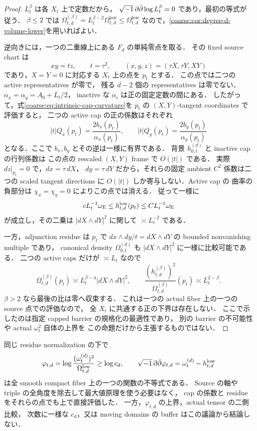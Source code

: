 \documentclass[a4paper,11pt]{ltjsarticle}
\numberwithin{equation}{section}
\theoremstyle{plain}
\theoremstyle{definition}
\theoremstyle{remark}
\begin{document}
\begin{proof}
$L_t^\beta$ は各 $X_t$ 上で定数だから，
$\sqrt{-1}\,\partial\bar\partial\log L_t^\beta=0$ であり，最初の等式が従う．
$\beta\le2$ では
$\Omega_{t,d}^{(\beta)}=L_t^{\beta-2}\Omega_{t,d}^{\mathrm{low}}
\le\Omega_{t,d}^{\mathrm{low}}$
なので，\cref{coarse:cor:degree-d-volume-lower}を用いればよい．

逆向きには，一つの二重線上にある $F_d$ の単純零点を取る．
その fixed source chart は
\[
 xy=tz,\qquad t=\tau^2,\qquad
 (x,y,z)=(\tau X,\tau Y,XY)
\]
であり，$X=Y=0$ に対応する $X_t$ 上の点を $p_t$ とする．
この点では二つの active representatives が零で，
残る $d-2$ 個の representatives は零でない．
$\alpha_x=\alpha_y=A_0+L_t/2$，
inactive な $\alpha_i$ は正の固定定数の間にある．
したがって，式\eqref{coarse:eq:intrinsic-cap-curvature}を
$p_t$ の $(X,Y)$-tangent coordinates で評価すると，
二つの active cap の正の係数はそれぞれ
\[
 |t|Q_x(p_t)=\frac{2b_x(p_t)}{\alpha_x(p_t)},
 \qquad
 |t|Q_y(p_t)=\frac{2b_y(p_t)}{\alpha_y(p_t)}
\]
となる．ここで $b_x,b_y$ とその逆は一様に有界である．
背景 $h_{0,t}^{(d)}$ と inactive cap の行列係数は
この点の rescaled $(X,Y)$ frame で $O(|t|)$ である．
実際 $dz|_{p_t}=0$ で，$dx=\tau\,dX$，
$dy=\tau\,dY$ だから，それらの固定 ambient
$C^2$ 係数は二つの scaled tangent directions に
$O(|t|)$ しか寄与しない．Active cap の
曲率の負部分は $\chi_x=\chi_y=0$ によりこの点では消える．
従って一様に
\[
 cL_t^{-1}\omega_{\rm E}\le h_{t,d}^{\mathrm{low}}(p_t)
 \le CL_t^{-1}\omega_{\rm E}
\]
が成立し，その二乗は
$|dX\wedge dY|^2$ に関して $\asymp L_t^{-2}$ である．

一方，adjunction residue は $p_t$ で
$dx\wedge dy/t=dX\wedge dY$ の
bounded nonvanishing multiple であり，
canonical density $\Omega_{0,t}^{(d)}$ も
$|dX\wedge dY|^2$ に一様に比較可能である．
二つの active caps だけが $\asymp L_t$ なので
\[
 \Omega_{t,d}^{(\beta)}(p_t)
 \asymp L_t^{\beta-4}|dX\wedge dY|^2,
 \qquad
 \frac{(h_{t,d}^{(\beta)})^2}{\Omega_{t,d}^{(\beta)}}(p_t)
 \asymp L_t^{2-\beta}.
\]
$\beta>2$ なら最後の比は零へ収束する．
これは一つの actual fiber 上の一つの source 点での評価なので，
全 $X_t$ に共通する正の下界は存在しない．
ここで示したのは指定 capped barrier の規格化の最適性であり，
別の barrier の不可能性や actual $\omega_t^2$ 自体の上界を
この命題だけから主張するものではない．
\end{proof}

\begin{remark}\label{coarse:rem:capped-global-potential}
同じ residue normalization の下で
\[
 \varphi_{t,d}=\log\frac{(\omega_t^{(d)})^2}{\Omega_{t,d}^{\mathrm{low}}}
 \ge\log c_d,
 \qquad
 \sqrt{-1}\,\partial\bar\partial\varphi_{t,d}=\omega_t^{(d)}-h_{t,d}^{\mathrm{low}}
\]
は全 smooth compact fiber 上の一つの関数の不等式である．
Source の軸や triple の全角度を除去して最大値原理を使う必要はなく，
cap の係数と residue をそれらの点でも上で直接評価した．
一方，$\varphi_{t,d}$ の上界，actual tensor の二側比較，
次数に一様な $c_d$，又は moving domains の buffer はこの議論から結論しない．
\end{remark}
\end{document}
